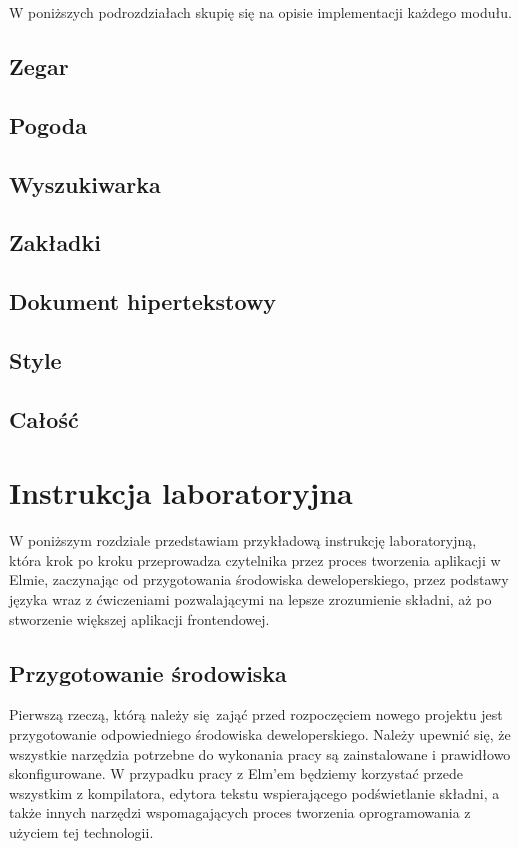 \documentclass[twoside,a4paper]{report}
\begin{document}
W poniższych podrozdziałach skupię się na opisie implementacji każdego modułu.

\section{Zegar}

\section{Pogoda}

\section{Wyszukiwarka}

\section{Zakładki}

\section{Dokument hipertekstowy}

\section{Style}

\section{Całość}


\chapter{Instrukcja laboratoryjna}
\lstset{frame=none}
W poniższym rozdziale przedstawiam przykładową instrukcję laboratoryjną, która krok po kroku przeprowadza czytelnika przez proces tworzenia aplikacji w Elmie, zaczynając od przygotowania środowiska deweloperskiego, przez podstawy języka wraz z ćwiczeniami pozwalającymi na lepsze zrozumienie składni, aż po stworzenie większej aplikacji frontendowej.

\section{Przygotowanie środowiska}
Pierwszą rzeczą, którą należy się zająć przed rozpoczęciem nowego projektu jest przygotowanie odpowiedniego środowiska deweloperskiego.
Należy upewnić się, że wszystkie narzędzia potrzebne do wykonania pracy są zainstalowane i prawidłowo skonfigurowane.
W przypadku pracy z Elm'em będziemy korzystać przede wszystkim z kompilatora, edytora tekstu wspierającego podświetlanie składni, a także innych narzędzi wspomagających proces tworzenia oprogramowania z użyciem tej technologii.
\end{document}
